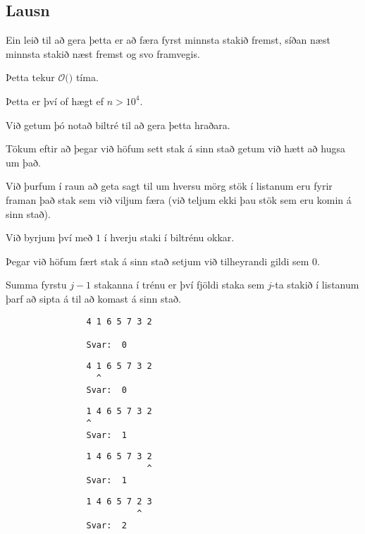 \subsection{Lausn}
{
    {
        \item<1-> Ein leið til að gera þetta er að færa fyrst minnsta stakið fremst, síðan næst minnsta stakið næst fremst og svo framvegis.
        \item<2-> Þetta tekur $\mathcal{O}($$)$ tíma.
        \item<4-> Þetta er því of hægt ef $n > 10^4$.
        \item<5-> Við getum þó notað biltré til að gera þetta hraðara.
        \item<6-> Tökum eftir að þegar við höfum sett stak á sinn stað getum við hætt að hugsa um það.
        \item<7-> Við þurfum í raun að geta sagt til um hversu mörg stök í listanum eru fyrir framan það stak sem við viljum færa
                (við teljum ekki þau stök sem eru komin á sinn stað).
        \item<8-> Við byrjum því með $1$ í hverju staki í biltrénu okkar.
        \item<9-> Þegar við höfum fært stak á sinn stað setjum við tilheyrandi gildi sem $0$.
        \item<10-> Summa fyrstu $j - 1$ stakanna í trénu er því fjöldi staka sem $j$-ta stakið í listanum þarf að sipta á til að komast á sinn stað.
    }
}
{ \begin{verbatim}
                4 1 6 5 7 3 2

                Svar:  0
\end{verbatim}}
{ \begin{verbatim}
                4 1 6 5 7 3 2
                  ^
                Svar:  0
\end{verbatim}}
{ \begin{verbatim}
                1 4 6 5 7 3 2
                ^
                Svar:  1
\end{verbatim}}
{ \begin{verbatim}
                1 4 6 5 7 3 2
                            ^
                Svar:  1
\end{verbatim}}
{ \begin{verbatim}
                1 4 6 5 7 2 3
                          ^
                Svar:  2
\end{verbatim}}
